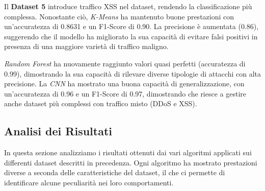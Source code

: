 \begin{table}[htbp]
\centering
\renewcommand{\arraystretch}{1.5} %
\caption{Metriche di performance per Dataset 5}
\label{tab:performance_metrics}
\end{table}

Il \textbf{Dataset 5} introduce traffico XSS nel dataset, rendendo la classificazione più complessa. Nonostante ciò, \textit{K-Means} ha mantenuto buone prestazioni con un'accuratezza di 0.8631 e un F1-Score di 0.90. La precisione è aumentata (0.86), suggerendo che il modello ha migliorato la sua capacità di evitare falsi positivi in presenza di una maggiore varietà di traffico maligno.

\textit{Random Forest} ha nuovamente raggiunto valori quasi perfetti (accuratezza di 0.99), dimostrando la sua capacità di rilevare diverse tipologie di attacchi con alta precisione. La \textit{CNN} ha mostrato una buona capacità di generalizzazione, con un'accuratezza di 0.96 e un F1-Score di 0.97, dimostrando che riesce a gestire anche dataset più complessi con traffico misto (DDoS e XSS).

\subsection{Analisi dei Risultati}
In questa sezione analizziamo i risultati ottenuti dai vari algoritmi applicati sui differenti dataset descritti in precedenza. Ogni algoritmo ha mostrato prestazioni diverse a seconda delle caratteristiche del dataset, il che ci permette di identificare alcune peculiarità nei loro comportamenti.

